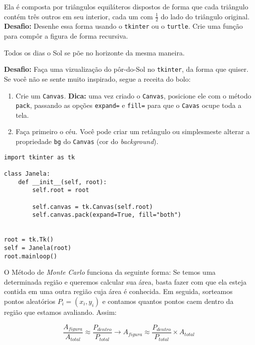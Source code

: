\documentclass[12pt]{article}
\begin{document}

	Ela é composta por triângulos equiláteros dispostos de forma que cada triângulo contém três outros em seu interior, cada um com $\frac{1}{2}$ do lado do triângulo original.\\
	
	\textbf{Desafio:} Desenhe essa forma usando o \texttt{tkinter} ou o \texttt{turtle}. Crie uma função para compôr a figura de forma recursiva.
	
	
	Todos os dias o Sol se põe no horizonte da mesma maneira.
	
	\textbf{Desafio:} Faça uma vizualização do pôr-do-Sol no \texttt{tkinter}, da forma que quiser. Se você não se sente muito inspirado, segue a receita do bolo:
	
	\begin{enumerate}
		\item Crie um \texttt{Canvas}. \textbf{Dica:} uma vez criado o \texttt{Canvas}, posicione ele com o método \texttt{pack}, passando as opções \texttt{expand=} e \texttt{fill=} para que o \texttt{Cavas} ocupe toda a tela.
		\item Faça primeiro o céu. Você pode criar um retângulo ou simplesmeste alterar a propriedade \texttt{bg} do \texttt{Canvas} (cor do \textit{background}).
	\end{enumerate}

	\begin{lstlisting}
import tkinter as tk

class Janela:
	def __init__(self, root):
		self.root = root
		
		self.canvas = tk.Canvas(self.root)
		self.canvas.pack(expand=True, fill="both")
		
		
root = tk.Tk()
self = Janela(root)
root.mainloop()
	\end{lstlisting}

	
	O Método de \emph{Monte Carlo} funciona da seguinte forma: Se temos uma determinada região e queremos calcular sua área, basta fazer com que ela esteja contida em uma outra região cuja área é conhecida. Em seguida, sorteamos pontos aleatórios $P_{i} = (x_{i}, y_{i})$ e contamos quantos pontos caem dentro da região que estamos avaliando. Assim:
	
	$$ \frac{A_{figura}}{A_{total}} \approx \frac{P_{dentro}}{P_{total}} \to A_{figura} \approx \frac{P_{dentro}}{P_{total}} \times A_{total} $$
\end{document}
